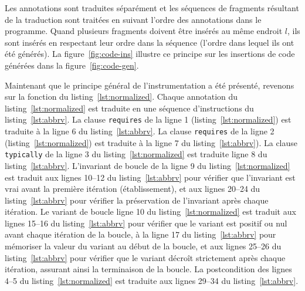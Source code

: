 

Les annotations \eacsl sont traduites séparément et les séquences de fragments
résultant de la traduction sont traitées en suivant l'ordre des annotations dans
le programme.
Quand plusieurs fragments doivent être insérés au même endroit $l$, ils sont
insérés en respectant leur ordre dans la séquence (l'ordre dans lequel ils ont
été générés).
La figure~\ref{fig:code-ins} illustre ce principe sur les insertions de code
générées dans la figure~\ref{fig:code-gen}.

Maintenant que le principe général de l'instrumentation a été présenté, revenons
sur la fonction du listing~\ref{lst:normalized}.
Chaque annotation du listing~\ref{lst:normalized} est traduite en une séquence
d'instructions du listing~\ref{lst:abbrv}.
La clause \lstinline'requires' de la ligne 1 (listing~\ref{lst:normalized}) est
traduite à la ligne 6 du listing~\ref{lst:abbrv}.
La clause \lstinline'requires' de la ligne 2 (listing~\ref{lst:normalized}) est
traduite à la ligne 7 du listing~\ref{lst:abbrv}).
La clause \lstinline'typically' de la ligne 3 du listing~\ref{lst:normalized}
est traduite ligne 8 du listing~\ref{lst:abbrv}.
L'invariant de boucle de la ligne 9 du listing~\ref{lst:normalized} est traduit
aux lignes 10--12 du listing~\ref{lst:abbrv} pour vérifier que l'invariant est
vrai avant la première itération (établissement), et aux lignes 20--24 du
listing~\ref{lst:abbrv} pour vérifier la préservation de l'invariant après
chaque itération.
Le variant de boucle ligne 10 du listing~\ref{lst:normalized} est traduit aux
lignes 15--16 du listing~\ref{lst:abbrv} pour vérifier que le variant est
positif ou nul avant chaque itération de la boucle, à la ligne 17 du
listing~\ref{lst:abbrv} pour mémoriser la valeur du variant au début de la
boucle, et aux lignes 25--26 du listing~\ref{lst:abbrv} pour vérifier que le
variant décroît strictement après chaque itération, assurant ainsi la
terminaison de la boucle.
La postcondition des lignes 4--5 du listing~\ref{lst:normalized} est traduite
aux lignes 29--34 du listing~\ref{lst:abbrv}.

